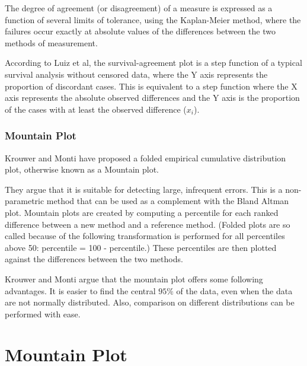 \documentclass[12pt, a4paper]{report}
\begin{document}
	
	The degree of agreement (or disagreement) of a measure is expressed as a function of several limits of tolerance, using the Kaplan-Meier method, where the failures occur exactly at absolute values of the differences between the two methods of measurement. 
	
	According to Luiz et al, the survival-agreement plot is a step function of a typical survival analysis without censored data, where the Y axis represents the proportion of discordant cases. This is equivalent to a step function where the X axis represents the absolute  observed differences and the Y axis is the proportion of the cases with at least the observed 
	difference ($x_i$). 
	
	
	
	
	
	
	
	
	\subsubsection{Mountain Plot} Krouwer and Monti have proposed a folded empirical cumulative distribution plot, otherwise known as a Mountain plot.
	
	They argue that it is suitable for detecting large, infrequent errors. This is a non-parametric method that can be used as a complement with the Bland Altman plot.  Mountain plots are created by computing a percentile
	for each ranked difference between a new method and a reference method. (Folded plots are so called because of the following transformation is performed for all percentiles above 50: percentile = 100 - percentile.) These percentiles are then plotted against the differences between the two methods.
	
	Krouwer and Monti argue that the mountain plot offers some following advantages. It is easier to find the central $95\%$ of the data, even when the data are not normally distributed. Also, comparison on different distributions can be performed with ease.
	
	
	



\section*{Mountain Plot}
\end{document}
